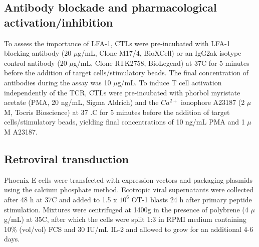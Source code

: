\subsection{Antibody blockade and pharmacological activation/inhibition}
To assess the importance of LFA-1, CTLs were pre-incubated with LFA-1 blocking antibody (20 $\mu$g/mL, Clone M17/4, BioXCell) or an IgG2ak isotype control antibody (20 $\mu$g/mL, Clone RTK2758, BioLegend) at 37\degree C for 5 minutes before the addition of target cells/stimulatory beads. The final concentration of antibodies during the assay was 10 $\mu$g/mL. To induce T cell activation independently of the TCR, CTLs were pre-incubated with phorbol myristate acetate (PMA, 20 ng/mL, Sigma Aldrich) and the $Ca^{2+}$ ionophore A23187 (2 $\mu$M, Tocris Bioscience) at 37 .C for 5 minutes before the addition of target cells/stimulatory beads, yielding final concentrations of 10 ng/mL PMA and 1 $\mu$M A23187.

\subsection{Retroviral transduction}
Phoenix E cells were transfected with expression vectors and packaging plasmids using the calcium phosphate method. Ecotropic viral supernatants were collected after 48 h at 37\degree C and added to 1.5 x $10^{6}$ OT-1 blasts 24 h after primary peptide stimulation. Mixtures were centrifuged at 1400g in the presence of polybrene (4 $\mu$g/mL) at 35\degree C, after which the cells were split 1:3 in RPMI medium containing 10\% (vol/vol) FCS and 30 IU/mL IL-2 and allowed to grow for an additional 4-6 days.

